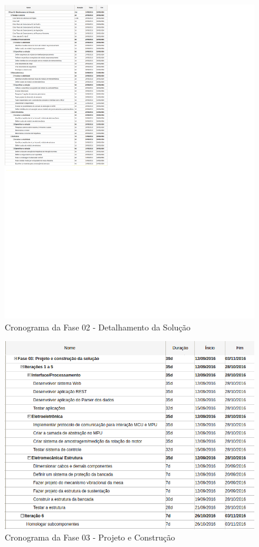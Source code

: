 \begin{apendicesenv}
\begin{figure}[!ht]
\centering
\includegraphics[scale=0.75]{figuras/cronograma_fase02.png}
\caption{Cronograma da Fase 02 - Detalhamento da Solução}
\end{figure}

\begin{figure}[!ht]
\centering
\includegraphics[scale=0.9]{figuras/cronograma_fase03.png}
\caption{Cronograma da Fase 03 - Projeto e Construção}
\end{figure}


\end{apendicesenv}
